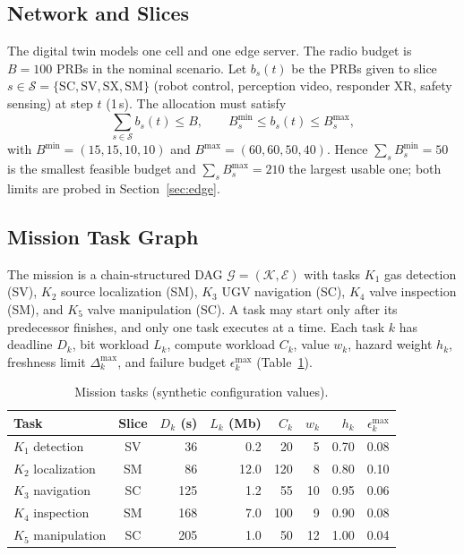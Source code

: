 \documentclass[conference]{IEEEtran}
\begin{document}
\subsection{Network and Slices}
The digital twin models one cell and one edge server. The radio budget is $B=100$ PRBs in the nominal scenario. Let $b_s(t)$ be the PRBs given to slice $s\in\mathcal{S}=\{\mathrm{SC},\mathrm{SV},\mathrm{SX},\mathrm{SM}\}$ (robot control, perception video, responder XR, safety sensing) at step $t$ (1\,s). The allocation must satisfy
\begin{equation}
\sum_{s\in\mathcal{S}} b_s(t)\le B,\qquad B_s^{\min}\le b_s(t)\le B_s^{\max},
\label{eq:prb}
\end{equation}
with $B^{\min}=(15,15,10,10)$ and $B^{\max}=(60,60,50,40)$. Hence $\sum_s B_s^{\min}=50$ is the smallest feasible budget and $\sum_s B_s^{\max}=210$ the largest usable one; both limits are probed in Section~\ref{sec:edge}.

\subsection{Mission Task Graph}
The mission is a chain-structured DAG $\mathcal{G}=(\mathcal{K},\mathcal{E})$ with tasks $K_1$ gas detection (SV), $K_2$ source localization (SM), $K_3$ UGV navigation (SC), $K_4$ valve inspection (SM), and $K_5$ valve manipulation (SC). A task may start only after its predecessor finishes, and only one task executes at a time. Each task $k$ has deadline $D_k$, bit workload $L_k$, compute workload $C_k$, value $w_k$, hazard weight $h_k$, freshness limit $\Delta_k^{\max}$, and failure budget $\epsilon_k^{\max}$ (Table~\ref{tab:tasks}).

\begin{table}[t]
\centering
\caption{Mission tasks (synthetic configuration values).}
\label{tab:tasks}
\scriptsize
\setlength{\tabcolsep}{3.5pt}
\begin{tabular}{lcrrrrrr}
\toprule
Task & Slice & $D_k$ (s) & $L_k$ (Mb) & $C_k$ & $w_k$ & $h_k$ & $\epsilon_k^{\max}$\\
\midrule
$K_1$ detection & SV & 36 & 0.2 & 20 & 5 & 0.70 & 0.08\\
$K_2$ localization & SM & 86 & 12.0 & 120 & 8 & 0.80 & 0.10\\
$K_3$ navigation & SC & 125 & 1.2 & 55 & 10 & 0.95 & 0.06\\
$K_4$ inspection & SM & 168 & 7.0 & 100 & 9 & 0.90 & 0.08\\
$K_5$ manipulation & SC & 205 & 1.0 & 50 & 12 & 1.00 & 0.04\\
\bottomrule
\end{tabular}
\end{table}
\end{document}
